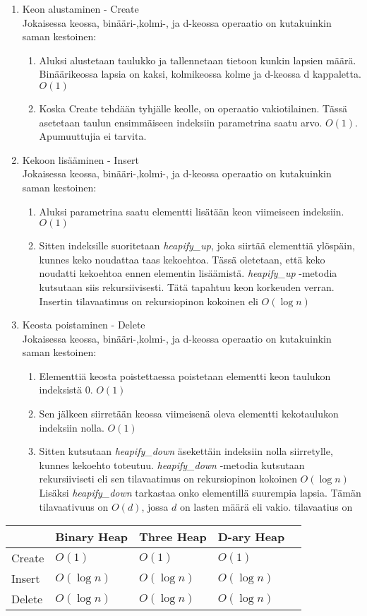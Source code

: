 \documentclass[a4paper,12pt]{article}
\begin{document}
\begin{enumerate}
\item Keon alustaminen - Create\\
Jokaisessa keossa, binääri-,kolmi-, ja d-keossa operaatio on kutakuinkin saman kestoinen:
\begin{enumerate}
\item Aluksi alustetaan taulukko ja tallennetaan tietoon kunkin lapsien määrä.
Binäärikeossa lapsia on kaksi, kolmikeossa kolme ja d-keossa d kappaletta. $O(1)$
\item Koska Create tehdään tyhjälle keolle, on operaatio vakiotilainen. Tässä asetetaan taulun ensimmäiseen indeksiin parametrina saatu arvo. $O(1)$. Apumuuttujia ei tarvita.
\end{enumerate}
\item Kekoon lisääminen - Insert\\
Jokaisessa keossa, binääri-,kolmi-, ja d-keossa operaatio on kutakuinkin saman kestoinen:
\begin{enumerate}
\item Aluksi parametrina saatu elementti lisätään keon viimeiseen indeksiin.$O(1)$
\item Sitten indeksille suoritetaan \emph{heapify\_up}, joka siirtää elementtiä ylöspäin, kunnes keko noudattaa taas kekoehtoa. Tässä oletetaan, että keko noudatti kekoehtoa ennen elementin lisäämistä. \emph{heapify\_up} -metodia kutsutaan siis rekursiivisesti.
Tätä tapahtuu keon korkeuden verran. Insertin tilavaatimus on rekursiopinon kokoinen eli $O(\log n)$
\end{enumerate}
\item Keosta poistaminen - Delete\\
Jokaisessa keossa, binääri-,kolmi-, ja d-keossa operaatio on kutakuinkin saman kestoinen:
\begin{enumerate}
\item Elementtiä keosta poistettaessa poistetaan elementti keon taulukon indeksistä 0. $O(1)$
\item Sen jälkeen siirretään keossa viimeisenä oleva elementti kekotaulukon indeksiin nolla. $O(1)$
\item Sitten kutsutaan \emph{heapify\_down} äsekettäin indeksiin nolla siirretylle, kunnes kekoehto toteutuu. \emph{heapify\_down} -metodia kutsutaan rekursiiviseti eli sen tilavaatimus on rekursiopinon kokoinen $O(\log n)$ Lisäksi \emph{heapify\_down} tarkastaa onko elementillä suurempia lapsia. Tämän tilavaativuus on $O(d)$, jossa $d$ on lasten määrä eli vakio. tilavaatius on
\end{enumerate}
\end{enumerate}
\begin{tabular}{|l|l|l|l|l|}
\hline
&Binary Heap & Three Heap & D-ary Heap \\\hline
Create & $O (1)$ & $O (1)$ & $O (1)$\\\hline
Insert & $O (\log n)$ & $O (\log n)$ & $O (\log n)$\\\hline
Delete  & $O (\log n)$ & $O (\log n)$ & $O (\log n)$\\\hline

\end{tabular}
\end{document}
